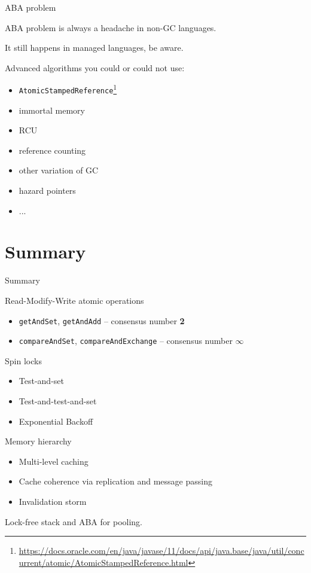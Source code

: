 \begin{frame}{ABA problem}

ABA problem is always a headache in non-GC languages. 

It still happens in managed languages, be aware.

Advanced algorithms you could or could not use:
\begin{itemize}
 \item \texttt{AtomicStampedReference}\footnote{\tiny\url{https://docs.oracle.com/en/java/javase/11/docs/api/java.base/java/util/concurrent/atomic/AtomicStampedReference.html}}
 \item immortal memory
 \item RCU
 \item reference counting
 \item other variation of GC
 \item hazard pointers
 \item ...
\end{itemize}

\end{frame}


\section{Summary}

\begin{frame}{Summary}

Read-Modify-Write atomic operations
\begin{itemize}
 \item \texttt{getAndSet}, \texttt{getAndAdd} -- consensus number \textbf{2}
 \item \texttt{compareAndSet}, \texttt{compareAndExchange} -- consensus number $\infty$
\end{itemize}

Spin locks
\begin{itemize}
  \item Test-and-set
  \item Test-and-test-and-set
  \item Exponential Backoff
\end{itemize}

Memory hierarchy
\begin{itemize}
  \item Multi-level caching
  \item Cache coherence via replication and message passing
  \item Invalidation storm  
\end{itemize}

Lock-free stack and ABA for pooling.

\end{frame}

